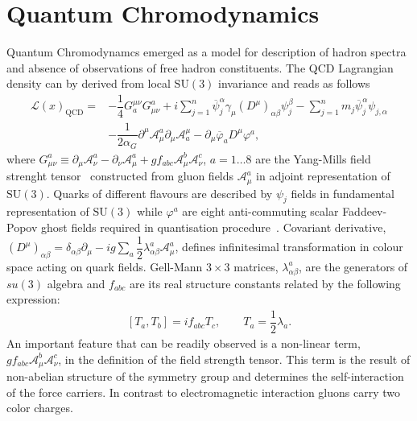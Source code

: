 \section{Quantum Chromodynamics}
Quantum Chromodynamcs emerged as a model for description of hadron spectra and absence of observations of free hadron constituents. The QCD Lagrangian density can by derived from local $\mathrm{SU}\left(3\right)$ invariance and reads as follows
\begin{align}
 \mathcal{L}\left( x\right)_{\mathrm{QCD}}  = & -\dfrac{1}{4}G_a^{\mu\nu}G_{\mu\nu}^a + i\sum_{j=1}^n{\overline{\psi}^{\alpha}_j \gamma_\mu \left( D^\mu \right)_{\alpha\beta} \psi_j^\beta } - \sum_{j=1}^n{m_j\overline{\psi}^{\alpha}_j\psi_{j,\alpha}} \\
					      & - \dfrac{1}{2\alpha_G} \partial^\mu \mathcal{A}^a_\mu \partial_\mu \mathcal{A}_a^\mu - \partial_\mu \overline{\varphi}_a D^\mu \varphi^a,
\end{align}
where $G_{\mu\nu}^a \equiv \partial_\mu \mathcal{A}^a_\nu - \partial_\nu \mathcal{A}^a_\mu + gf_{abc}\mathcal{A}^b_\mu \mathcal{A}^c_\nu $, $a=1 \ldots 8$ are the Yang-Mills field strenght tensor~\cite{C.N. Yang and R.L. Mills, Phys. Rev. 96 (1954) 191.} constructed from gluon fields $\mathcal{A}^a_\mu$ in adjoint representation of $\mathrm{SU}\left(3\right)$. Quarks of different flavours are described by $\psi_j$ fields in fundamental representation of $\mathrm{SU}\left(3\right)$ while $\varphi^a$ are eight anti-commuting scalar Faddeev-Popov ghost fields required in quantisation procedure~\cite{L.D. Faddeev and Y.N Popov, Phys. Lett. B 25 (1967) 29;
B. De Wit, Phys. Rev. Lett. 12 (1964) 742.}. Covariant derivative, $\left( D^\mu \right)_{\alpha\beta} = \delta_{\alpha\beta}\partial_\mu - ig\sum_a{\dfrac{1}{2}\lambda^a_{\alpha\beta}\mathcal{A}^a_\mu}$, defines infinitesimal transformation in colour space acting on quark fields. Gell-Mann $3\times 3$ matrices, $\lambda^a_{\alpha\beta}$, are the generators of $su\left(3\right)$ algebra and $f_{abc}$ are its real structure constants related by the following expression:
\begin{align}
 \left[T_a,T_b\right] = if_{abc}T_c,\qquad T_a = \dfrac{1}{2}\lambda_a.
\end{align}
An important feature that can be readily observed is a non-linear term, $gf_{abc}\mathcal{A}^b_\mu \mathcal{A}^c_\nu$, in the definition of the field strength tensor. This term is the result of non-abelian structure of the symmetry group and determines the self-interaction of the force carriers. In contrast to electromagnetic interaction gluons carry two color charges. 


